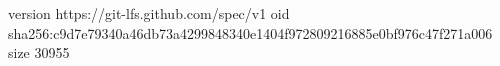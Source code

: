 version https://git-lfs.github.com/spec/v1
oid sha256:c9d7e79340a46db73a4299848340e1404f972809216885e0bf976c47f271a006
size 30955
